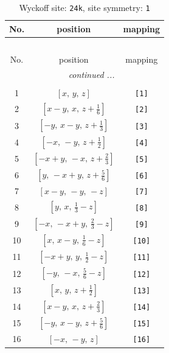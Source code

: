 \documentclass[fleqn,8pt]{jsarticle}
\begin{document}
\begin{longtable}{ccc}
\caption{Wyckoff site: {\tt 24k}, site symmetry: {\tt 1}}
 \\
 \hline \hline
No. & position & mapping \\ \hline \endfirsthead

\multicolumn{2}{l}{\tablename\ \thetable{}} \\
 \hline \hline
No. & position & mapping \\ \hline \endhead

 \hline \hline
\multicolumn{2}{r}{\footnotesize\it continued ...} \\ \endfoot

 \hline \hline
\multicolumn{2}{r}{} \\ \endlastfoot

1 & $\left[ x,\, y,\, z \right]$ & {\tt [1]} \\ \hline
2 & $\left[ x - y,\, x,\, z + \frac{1}{6} \right]$ & {\tt [2]} \\ \hline
3 & $\left[ - y,\, x - y,\, z + \frac{1}{3} \right]$ & {\tt [3]} \\ \hline
4 & $\left[ - x,\, - y,\, z + \frac{1}{2} \right]$ & {\tt [4]} \\ \hline
5 & $\left[ - x + y,\, - x,\, z + \frac{2}{3} \right]$ & {\tt [5]} \\ \hline
6 & $\left[ y,\, - x + y,\, z + \frac{5}{6} \right]$ & {\tt [6]} \\ \hline
7 & $\left[ x - y,\, - y,\, - z \right]$ & {\tt [7]} \\ \hline
8 & $\left[ y,\, x,\, \frac{1}{3} - z \right]$ & {\tt [8]} \\ \hline
9 & $\left[ - x,\, - x + y,\, \frac{2}{3} - z \right]$ & {\tt [9]} \\ \hline
10 & $\left[ x,\, x - y,\, \frac{1}{6} - z \right]$ & {\tt [10]} \\ \hline
11 & $\left[ - x + y,\, y,\, \frac{1}{2} - z \right]$ & {\tt [11]} \\ \hline
12 & $\left[ - y,\, - x,\, \frac{5}{6} - z \right]$ & {\tt [12]} \\ \hline
13 & $\left[ x,\, y,\, z + \frac{1}{2} \right]$ & {\tt [13]} \\ \hline
14 & $\left[ x - y,\, x,\, z + \frac{2}{3} \right]$ & {\tt [14]} \\ \hline
15 & $\left[ - y,\, x - y,\, z + \frac{5}{6} \right]$ & {\tt [15]} \\ \hline
16 & $\left[ - x,\, - y,\, z \right]$ & {\tt [16]} \\ \hline

\end{longtable}
\end{document}
